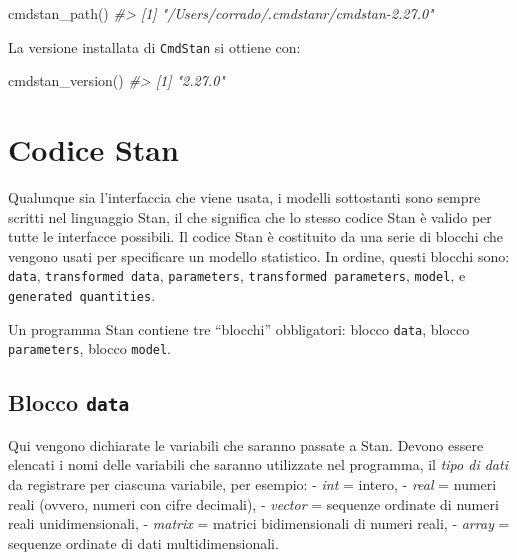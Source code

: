 \documentclass[
]{memoir}
\newenvironment{Shaded}{\begin{snugshade}}{\end{snugshade}}
\newcommand{\CommentTok}[1]{\textcolor[rgb]{0.56,0.35,0.01}{\textit{#1}}}
\newcommand{\FunctionTok}[1]{\textcolor[rgb]{0.00,0.00,0.00}{#1}}
\newcommand{\NormalTok}[1]{#1}
\begin{document}
\begin{Shaded}
\begin{Highlighting}[]
\FunctionTok{cmdstan\_path}\NormalTok{()}
\CommentTok{\#\textgreater{} [1] "/Users/corrado/.cmdstanr/cmdstan{-}2.27.0"}
\end{Highlighting}
\end{Shaded}

\noindent
La versione installata di \texttt{CmdStan} si ottiene con:

\begin{Shaded}
\begin{Highlighting}[]
\FunctionTok{cmdstan\_version}\NormalTok{()}
\CommentTok{\#\textgreater{} [1] "2.27.0"}
\end{Highlighting}
\end{Shaded}

\hypertarget{codice-stan}{%
\section{Codice Stan}\label{codice-stan}}

Qualunque sia l'interfaccia che viene usata, i modelli sottostanti sono sempre scritti nel linguaggio Stan, il che significa che lo stesso codice Stan è valido per tutte le interfacce possibili. Il codice Stan è costituito da una serie di blocchi che vengono usati per specificare un modello statistico. In ordine, questi blocchi sono: \texttt{data}, \texttt{transformed\ data}, \texttt{parameters}, \texttt{transformed\ parameters}, \texttt{model}, e \texttt{generated\ quantities}.

Un programma Stan contiene tre ``blocchi'' obbligatori: blocco \texttt{data}, blocco \texttt{parameters}, blocco \texttt{model}.

\hypertarget{blocco-data}{%
\subsection{\texorpdfstring{Blocco \texttt{data}}{Blocco data}}\label{blocco-data}}

Qui vengono dichiarate le variabili che saranno passate a Stan. Devono essere elencati i nomi delle variabili che saranno utilizzate nel programma, il \emph{tipo di dati} da registrare per ciascuna variabile, per esempio:
- \emph{int} = intero,
- \emph{real} = numeri reali (ovvero, numeri con cifre decimali),
- \emph{vector} = sequenze ordinate di numeri reali unidimensionali,
- \emph{matrix} = matrici bidimensionali di numeri reali,
- \emph{array} = sequenze ordinate di dati multidimensionali.
\end{document}
